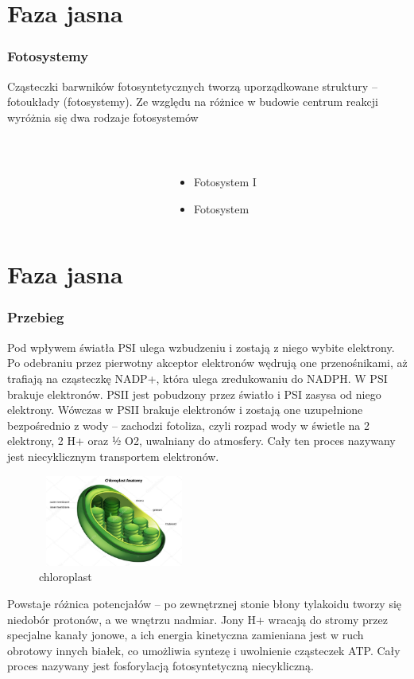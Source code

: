 \documentclass{beamer}
\begin{document}
\section{Faza jasna}
	\begin{frame}
		\frametitle{Fotosystemy}
			Cząsteczki barwników fotosyntetycznych tworzą uporządkowane struktury – fotoukłady (fotosystemy). Ze względu na różnice w budowie centrum reakcji wyróżnia się dwa rodzaje fotosystemów
		\begin{columns}[t]
			\begin{column}{.5\textwidth}
				\label{fig: faza jasna}
			\end{column}
			\begin{column}{.5\textwidth}
				\\\begin{itemize}
					\item Fotosystem I
					\item Fotosystem
				\end{itemize}
			\end{column}
		\end{columns}
	\end{frame}

\section{Faza jasna}
	\begin{frame}
		\frametitle{Przebieg}
		Pod wpływem światła PSI ulega wzbudzeniu i zostają z niego wybite elektrony. Po odebraniu przez pierwotny akceptor elektronów wędrują one przenośnikami, aż trafiają na cząsteczkę NADP+, która ulega zredukowaniu do NADPH. W PSI brakuje elektronów. PSII jest pobudzony przez światło i PSI zasysa od niego elektrony. Wówczas w PSII brakuje elektronów i zostają one uzupełnione bezpośrednio z wody – zachodzi fotoliza, czyli rozpad wody w świetle na 2 elektrony, 2 H+ oraz ½ O2, uwalniany do atmosfery. Cały ten proces nazywany jest niecyklicznym transportem elektronów.
		\begin{figure}[H]
			\centering
			\includegraphics[width=5cm, height=3cm]{chloroplast.jpg}
			\caption{chloroplast}
			\label{fig: chloroplast}
		\end{figure}
		Powstaje różnica potencjałów – po zewnętrznej stonie błony tylakoidu tworzy się niedobór protonów, a we wnętrzu nadmiar. Jony H+ wracają do stromy przez specjalne kanały jonowe, a ich energia kinetyczna zamieniana jest w ruch obrotowy innych białek, co umożliwia syntezę i uwolnienie cząsteczek ATP. Cały proces nazywany jest fosforylacją fotosyntetyczną niecykliczną.
	\end{frame}
\end{document}
